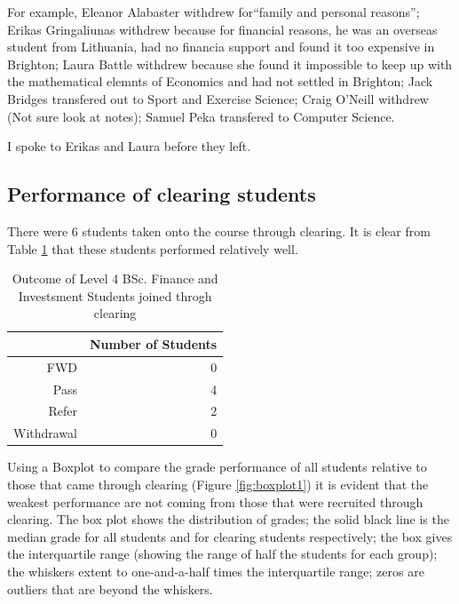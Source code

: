 \documentclass[12pt, a4paper, oneside]{article}\usepackage[]{graphicx}\usepackage[]{color}
\begin{document}
For example, Eleanor Alabaster withdrew for``family and personal reasons'';  Erikas Gringaliunas withdrew because for financial reasons, he was an overseas student from Lithuania, had no financia support and found it too expensive in Brighton; Laura Battle withdrew because she found it impossible to keep up with the mathematical elemnts of Economics and had not settled in Brighton; Jack Bridges transfered out to Sport and Exercise Science; Craig O'Neill withdrew (Not sure look at notes); Samuel Peka transfered to Computer Science. 

I spoke to Erikas and Laura before they left.  

\subsection*{Performance of clearing students}
There were 6 students taken  onto the course through clearing. It is clear from Table \ref{tabref:out2} that these students performed relatively well.   

\begin{table}[ht]
\centering
\begin{tabular}{rr}
  \hline
 & Number of Students \\ 
  \hline
FWD &   0 \\ 
  Pass &   4 \\ 
  Refer &   2 \\ 
  Withdrawal &   0 \\ 
   \hline
\end{tabular}
\caption{Outcome of Level 4 BSc. Finance and Investsment Students joined throgh clearing} 
\label{tabref:out2}
\end{table}

Using a Boxplot to compare the grade performance of all students relative to those that came through clearing (Figure \ref{fig:boxplot1}) it is evident that the weakest performance are not coming from those that were recruited through clearing.  The box plot shows the distribution of grades; the solid black line is the median grade for all students and for clearing students respectively; the box gives the interquartile range (showing the range of half the students for each group); the whiskers extent to one-and-a-half times the interquartile range; zeros are outliers that are beyond the whiskers. 
\end{document}
